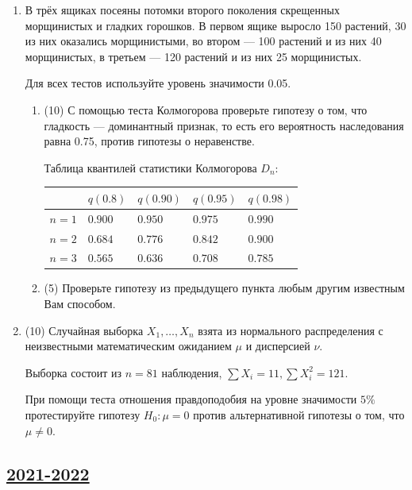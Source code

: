 \begin{enumerate}
\item В трёх ящиках посеяны потомки второго поколения скрещенных морщинистых и гладких горошков.  
В первом ящике выросло 150 растений, 30 из них оказались морщинистыми, 
во втором — 100 растений и из них 40 морщинистых, в третьем — 120 растений и из них 25 морщинистых.

Для всех тестов используйте уровень значимости 0.05.

\begin{enumerate}
\item (10) С помощью теста Колмогорова проверьте гипотезу о том, что гладкость — доминантный признак, то есть его вероятность наследования равна 0.75, против гипотезы о неравенстве.

Таблица квантилей статистики Колмогорова $D_n$:

\begin{tabular}{cllll}
\toprule
 & $q(0.8)$ & $q(0.90)$ & $q(0.95)$ & $q(0.98)$\\
\midrule
$n=1$ & $0.900$ & $0.950$ & $0.975$ & $0.990$ \\
$n=2$ & $0.684$ & $0.776$ & $0.842$ & $0.900$ \\
$n=3$ & $0.565$ & $0.636$ & $0.708$ & $0.785$ \\
\bottomrule
\end{tabular}

\item  (5) Проверьте гипотезу из предыдущего пункта любым другим известным Вам способом. 
\end{enumerate}

\item (10) Случайная выборка $X_1, \ldots, X_n$ взята из нормального распределения с неизвестными математическим ожиданием $\mu$ и   дисперсией $\nu$. 

Выборка состоит из $n=81$ наблюдения, $\sum X_i=11, \sum X_i^2=121$. 

При помощи теста отношения правдоподобия на уровне значимости $5 \%$ протестируйте гипотезу $H_0: \mu=0$ против альтернативной гипотезы  о том, что $\mu \neq 0$.

\end{enumerate}



\subsection[2021-2022]{\hyperref[sec:sol_kr_04_2021_2022]{2021-2022}}
\label{sec:kr_04_2021_2022}

